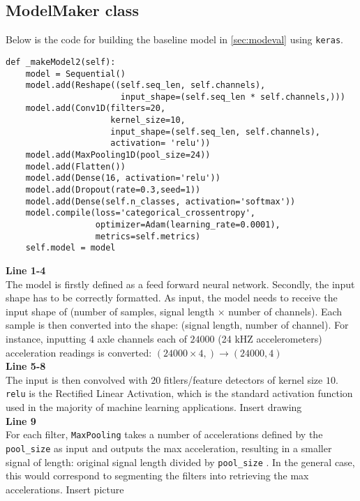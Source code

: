 \subsection{ModelMaker class}
\label{sec:modelmaker}
Below is the code for building the baseline model in \ref{sec:modeval} using \verb|keras|. 
\begin{verbatim}
def _makeModel2(self):
    model = Sequential()
    model.add(Reshape((self.seq_len, self.channels),
                       input_shape=(self.seq_len * self.channels,)))
    model.add(Conv1D(filters=20,
                     kernel_size=10,
                     input_shape=(self.seq_len, self.channels),
                     activation= 'relu')) 
    model.add(MaxPooling1D(pool_size=24))
    model.add(Flatten())
    model.add(Dense(16, activation='relu'))
    model.add(Dropout(rate=0.3,seed=1))
    model.add(Dense(self.n_classes, activation='softmax'))
    model.compile(loss='categorical_crossentropy',
                  optimizer=Adam(learning_rate=0.0001),
                  metrics=self.metrics)
    self.model = model
\end{verbatim}

\noindent \textbf{Line 1-4}\\
The model is firstly defined as a feed forward neural network. Secondly, the input shape has to be correctly formatted. As input, the model needs to receive the input shape of (number of samples, signal length $\times$ number of channels). Each sample is then converted into the shape: (signal length, number of channel). For instance, inputting 4 axle channels each of $24000$ (24 kHZ accelerometers) acceleration readings is converted: $(24000 \times 4,) \rightarrow (24000, 4)$\\

\noindent \textbf{Line 5-8}\\
The input is then convolved with $20$ fitlers/feature detectors of kernel size $10$. \verb|relu| is the Rectified Linear Activation, which is the standard activation function used in the majority of machine learning applications. Insert drawing\todo{}\\

\noindent\textbf{Line 9}\\
For each filter, \verb|MaxPooling| takes a number of accelerations defined by the \verb|pool_size| as input and outputs the max acceleration, resulting in a smaller signal of length: original signal length divided by \verb|pool_size| . In the general case, this would correspond to segmenting the filters into retrieving the max accelerations. Insert picture\todo{}\\

